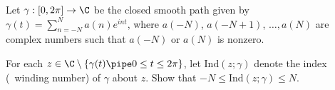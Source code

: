 Let $\gamma:[0,2\pi]\rightarrow \C$ be the closed smooth path given by
$\gamma(t)=\sum_{n=-N}^Na(n)e^{int}$, where $a(-N)$, $a(-N+1)$,
$\ldots,a(N)$ are complex numbers such that $a(-N)$ or $a(N)$ is nonzero.

For each $z\in \C\setminus \{\gamma(t)\pipe 0\leq t\leq 2\pi\}$, let
$\mathrm{Ind}(z;\gamma)$ denote the index (\ie\ winding number) of
$\gamma$ about $z$. Show that $-N\leq \mathrm{Ind}(z;\gamma)\leq N$.
